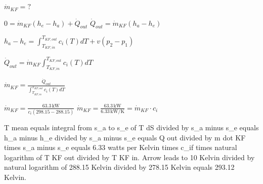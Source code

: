 \( \dot{m}_{KF} = ? \)  

\( 0 = \dot{m}_{KF} (h_e - h_a) + \dot{Q}_{out} \)  
\( \dot{Q}_{out} = \dot{m}_{KF} (h_a - h_e) \)  

\( h_a - h_e = \int_{T_{KF,in}}^{T_{KF,out}} c_i (T) dT + v (p_{2} - p_{1}) \)  

\( \dot{Q}_{out} = \dot{m}_{KF} \int_{T_{KF,in}}^{T_{KF,out}} c_i (T) dT \)  

\( \dot{m}_{KF} = \frac{\dot{Q}_{out}}{\int_{T_{KF,in}}^{T_{KF,out}} c_i (T) dT} \)  

\( \dot{m}_{KF} = \frac{63.3 \, \text{kW}}{c_i (298.15 - 288.15)} \)  
\( \dot{m}_{KF} = \frac{63.3 \, \text{kW}}{6.33 \, \text{kW/K}} = \dot{m}_{KF} \cdot c_i \)

T mean equals integral from s_a to s_e of T dS divided by s_a minus s_e equals h_a minus h_e divided by s_a minus s_e equals Q out divided by m dot KF times s_a minus s_e equals 6.33 watts per Kelvin times c_if times natural logarithm of T KF out divided by T KF in.  
Arrow leads to 10 Kelvin divided by natural logarithm of 288.15 Kelvin divided by 278.15 Kelvin equals 293.12 Kelvin.